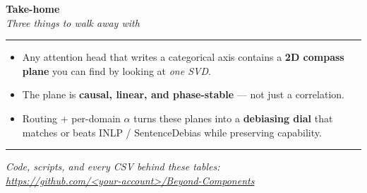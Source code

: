 \documentclass[12pt]{article}
\newcommand{\paneltitle}[2]{%
  {\noindent\color{accentA}\Huge\bfseries #1}\\[0.1em]
  {\color{muted}\LARGE\itshape #2}\par\vspace{0.3em}
  \textcolor{accentA}{\rule{\linewidth}{1.2pt}}\par\vspace{0.6em}}
\newenvironment{panelbullets}{%
  \par\vspace{0.2em}\large\begin{itemize}\setlength{\itemsep}{0.35em}}{\end{itemize}}
\begin{document}
\paneltitle{Take-home}{Three things to walk away with}

\vspace{1em}
\begin{panelbullets}
\item[\textbf{1.}] Any attention head that writes a categorical axis
  contains a \textcolor{accentA}{\textbf{2D compass plane}} you can
  find by looking at \emph{one SVD}.
\item[\textbf{2.}] The plane is
  \textcolor{accentB}{\textbf{causal, linear, and phase-stable}} ---
  not just a correlation.
\item[\textbf{3.}] Routing + per-domain $\alpha$ turns these planes
  into a \textbf{debiasing dial} that matches or beats INLP /
  SentenceDebias while preserving capability.
\end{panelbullets}

\vspace{1.5em}
\textcolor{accentA}{\rule{\linewidth}{0.8pt}}\par\vspace{0.5em}
{\Large\itshape
Code, scripts, and every CSV behind these tables:\\
\url{https://github.com/<your-account>/Beyond-Components}}
\end{document}
